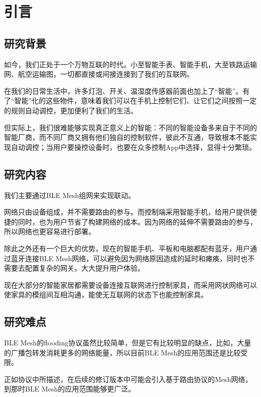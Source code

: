 \chapter{引言}

\section{研究背景}
如今，我们正处于一个万物互联的时代。小至智能手表、智能手机，大至铁路运输网、航空运输图，一切都直接或间接连接到了我们的互联网。

在我们的日常生活中，许多灯泡、开关、温湿度传感器前面也加上了“智能”。有了“智能”化的这些物件，意味着我们可以在手机上控制它们、让它们之间按照一定的规则自动调控，更加便利了我们的生活。

但实际上，我们很难能够实现真正意义上的智能：不同的智能设备多来自于不同的智能厂商，而不同厂商又拥有他们独自的控制软件，彼此不互通，导致根本不能实现自动调控；当用户要操控设备时，也要在众多控制App中选择，显得十分繁琐。

\section{研究内容}
我们主要通过BLE Mesh组网来实现联动。

网络只由设备组成，并不需要路由的参与。而控制端采用智能手机，给用户提供便捷的同时，也为用户节省了构建网络的成本。因为网络的延伸不需要路由的参与，所以网络也更容易进行部署。

除此之外还有一个巨大的优势，现在的智能手机、平板和电脑都配有蓝牙，用户通过蓝牙连接BLE Mesh网络，可以避免因为网络原因造成的延时和瘫痪，同时也不需要去配置复杂的网关。大大提升用户体验。

现在大部分的智能家居都需要设备连接互联网进行控制家具，而采用网状网络可以使家具的模组间互相沟通，能使无互联网的状态下也能控制家具。

\section{研究难点}
BLE Mesh的flooding协议虽然比较简单，但是它有比较明显的缺点，比如，大量的广播包转发消耗更多的网络能量，所以目前BLE Mesh的应用范围还是比较受限。

正如协议中所描述，在后续的修订版本中可能会引入基于路由协议的Mesh网络，到那时BLE Mesh的应用范围能够更广泛。
